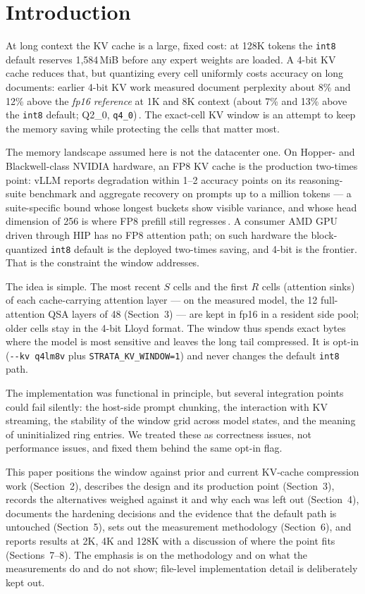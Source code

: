 \documentclass[10pt,twocolumn]{article}
\begin{document}
\section{Introduction}

At long context the KV cache is a large, fixed cost: at 128K tokens the \texttt{int8} default reserves 1,584\,MiB before any expert weights are loaded. A 4-bit KV cache reduces that, but quantizing every cell uniformly costs accuracy on long documents: earlier 4-bit KV work measured document perplexity about 8\% and 12\% above the \emph{fp16 reference} at 1K and 8K context (about 7\% and 13\% above the \texttt{int8} default; Q2\_0, \texttt{q4\_0})\,\cite{strata-kv4,strata-details}. The exact-cell KV window is an attempt to keep the memory saving while protecting the cells that matter most.

The memory landscape assumed here is not the datacenter one. On Hopper- and Blackwell-class NVIDIA hardware, an FP8 KV cache is the production two-times point: vLLM reports degradation within 1--2 accuracy points on its reasoning-suite benchmark and aggregate recovery on prompts up to a million tokens --- a suite-specific bound whose longest buckets show visible variance, and whose head dimension of 256 is where FP8 prefill still regresses\,\cite{vllm-fp8}. A consumer AMD GPU driven through HIP has no FP8 attention path; on such hardware the block-quantized \texttt{int8} default is the deployed two-times saving, and 4-bit is the frontier. That is the constraint the window addresses.

The idea is simple. The most recent $S$ cells and the first $R$ cells (attention sinks) of each cache-carrying attention layer --- on the measured model, the 12 full-attention QSA layers of 48 (Section~3) --- are kept in fp16 in a resident side pool; older cells stay in the 4-bit Lloyd format. The window thus spends exact bytes where the model is most sensitive and leaves the long tail compressed. It is opt-in (\texttt{-{}-kv q4lm8v} plus \texttt{STRATA\_KV\_WINDOW=1}) and never changes the default \texttt{int8} path.

The implementation was functional in principle, but several integration points could fail silently: the host-side prompt chunking, the interaction with KV streaming, the stability of the window grid across model states, and the meaning of uninitialized ring entries. We treated these as correctness issues, not performance issues, and fixed them behind the same opt-in flag.

This paper positions the window against prior and current KV-cache compression work (Section~2), describes the design and its production point (Section~3), records the alternatives weighed against it and why each was left out (Section~4), documents the hardening decisions and the evidence that the default path is untouched (Section~5), sets out the measurement methodology (Section~6), and reports results at 2K, 4K and 128K with a discussion of where the point fits (Sections~7--8). The emphasis is on the methodology and on what the measurements do and do not show; file-level implementation detail is deliberately kept out.
\end{document}
